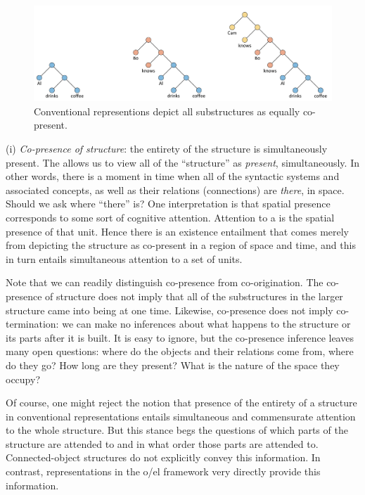 \begin{figure}
\includegraphics[width=\textwidth]{figures/Tilsen-img110.png}
\caption{Conventional representions depict all substructures as equally co-present.}
\label{fig:5:6}
\end{figure}
 

(i) \textit{Co-presence of structure}: the entirety of the structure is simultaneously present. The  allows us to view all of the “structure” as \textit{present}, simultaneously. In other words, there is a moment in time when all of the syntactic systems and associated concepts, as well as their relations (connections) are \textit{there}, in space. Should we ask where “there” is? One interpretation is that spatial presence corresponds to some sort of cognitive attention. Attention to a  is the spatial presence of that unit. Hence there is an existence entailment that comes merely from depicting the structure as co-present in a region of space and time, and this in turn entails simultaneous attention to a set of units.

  Note that we can readily distinguish co-presence from co-origination. The co-presence of structure does not imply that all of the substructures in the larger structure came into being at one time. Likewise, co-presence does not imply co-termination: we can make no inferences about what happens to the structure or its parts after it is built. It is easy to ignore, but the co-presence inference leaves many open questions: where do the objects and their relations come from, where do they go? How long are they present? What is the nature of the space they occupy?
  
  Of course, one might reject the notion that presence of the entirety of a structure in conventional representations entails simultaneous and commensurate attention to the whole structure. But this stance begs the questions of which parts of the structure are attended to and in what order those parts are attended to. Connected-object structures do not explicitly convey this information. In contrast, representations in the o/el framework very directly provide this information.

